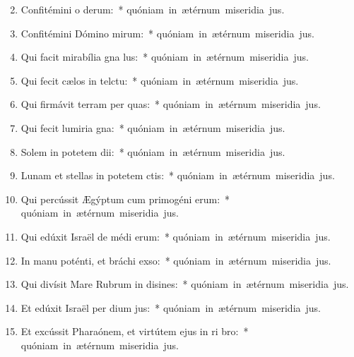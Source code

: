 \begin{flushleft}
\begin{enumerate}[leftmargin=*]
\setcounter{enumi}{1}

\item Confitémini o derum:~* \mbox{quóniam in ætérnum miseridia jus.}
\item Confitémini Dómino mirum:~* \mbox{quóniam in ætérnum miseridia jus.}
\item Qui facit mirabília gna lus:~* \mbox{quóniam in ætérnum miseridia jus.}
\item Qui fecit cælos in telctu:~* \mbox{quóniam in ætérnum miseridia jus.}
\item Qui firmávit terram per quas:~* \mbox{quóniam in ætérnum miseridia jus.}
\item Qui fecit lumiria gna:~* \mbox{quóniam in ætérnum miseridia jus.}
\item Solem in potetem dii:~* \mbox{quóniam in ætérnum miseridia jus.}
\item Lunam et stellas in potetem ctis:~* \mbox{quóniam in ætérnum miseridia jus.}
\item Qui percússit Ægýptum cum primogéni erum:~* \mbox{quóniam in ætérnum miseridia jus.}
\item Qui edúxit Israël de médi erum:~* \mbox{quóniam in ætérnum miseridia jus.}
\item In manu poténti, et bráchi exso:~* \mbox{quóniam in ætérnum miseridia jus.}
\item Qui divísit Mare Rubrum in disines:~* \mbox{quóniam in ætérnum miseridia jus.}
\item Et edúxit Israël per dium jus:~* \mbox{quóniam in ætérnum miseridia jus.}
\item Et excússit Pharaónem, et virtútem ejus in ri bro:~* \mbox{quóniam in ætérnum miseridia jus.}

\end{enumerate}
\end{flushleft}
